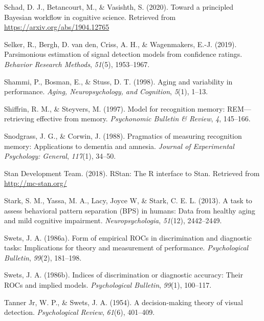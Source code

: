 \documentclass[
  english,
  ,man,floatsintext]{apa6}
\begin{document}
\leavevmode\hypertarget{ref-SchadEtAlpreprint}{}%
Schad, D. J., Betancourt, M., \& Vasishth, S. (2020). Toward a principled Bayesian workflow in cognitive science. Retrieved from \url{https://arxiv.org/abs/1904.12765}

\leavevmode\hypertarget{ref-selker2019parsimonious}{}%
Selker, R., Bergh, D. van den, Criss, A. H., \& Wagenmakers, E.-J. (2019). Parsimonious estimation of signal detection models from confidence ratings. \emph{Behavior Research Methods}, \emph{51}(5), 1953--1967.

\leavevmode\hypertarget{ref-shammi1998aging}{}%
Shammi, P., Bosman, E., \& Stuss, D. T. (1998). Aging and variability in performance. \emph{Aging, Neuropsychology, and Cognition}, \emph{5}(1), 1--13.

\leavevmode\hypertarget{ref-ShiffrinAndSteyvers1997}{}%
Shiffrin, R. M., \& Steyvers, M. (1997). Model for recognition memory: REM---retrieving effective from memory. \emph{Psychonomic Bulletin \& Review}, \emph{4}, 145--166.

\leavevmode\hypertarget{ref-SnodgrassAndCorwin1988}{}%
Snodgrass, J. G., \& Corwin, J. (1988). Pragmatics of measuring recognition memory: Applications to dementia and amnesia. \emph{Journal of Experimental Psychology: General}, \emph{117}(1), 34--50.

\leavevmode\hypertarget{ref-rstan}{}%
Stan Development Team. (2018). RStan: The R interface to Stan. Retrieved from \url{http://mc-stan.org/}

\leavevmode\hypertarget{ref-StarkEtAl2013}{}%
Stark, S. M., Yassa, M. A., Lacy, Joyce W, \& Stark, C. E. L. (2013). A task to assess behavioral pattern separation (BPS) in humans: Data from healthy aging and mild cognitive impairment. \emph{Neuropsychologia}, \emph{51}(12), 2442--2449.

\leavevmode\hypertarget{ref-Swets1986b}{}%
Swets, J. A. (1986a). Form of empirical ROCs in discrimination and diagnostic tasks: Implications for theory and measurement of performance. \emph{Psychological Bulletin}, \emph{99}(2), 181--198.

\leavevmode\hypertarget{ref-Swets1986a}{}%
Swets, J. A. (1986b). Indices of discrimination or diagnostic accuracy: Their ROCs and implied models. \emph{Psychological Bulletin}, \emph{99}(1), 100--117.

\leavevmode\hypertarget{ref-TannerAndSwets1954}{}%
Tanner Jr, W. P., \& Swets, J. A. (1954). A decision-making theory of visual detection. \emph{Psychological Review}, \emph{61}(6), 401--409.
\end{document}
